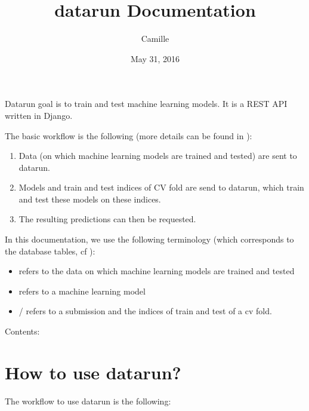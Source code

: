 \documentclass[letterpaper,10pt,english]{sphinxmanual}
\title{datarun Documentation}
\date{May 31, 2016}
\author{Camille}
\begin{document}
\maketitle
\tableofcontents
{}\label{index::doc}


Datarun goal is to train and test machine learning models. It is a REST API written in Django.

The basic workflow is the following (more details can be found in {\hyperref[modules/workflow:workflow]{}}):
\begin{enumerate}
\item {} 
Data (on which machine learning models are trained and tested) are sent to datarun.

\item {} 
Models and train and test indices of CV fold are send to datarun, which train and test these models on these indices.

\item {} 
The resulting predictions can then be requested.

\end{enumerate}

In this documentation, we use the following terminology (which corresponds to the database tables, cf {\hyperref[modules/models:models]{}}):
\begin{itemize}
\item {} 
 refers to the data on which machine learning models are trained and tested

\item {} 
 refers to a machine learning model

\item {} 
 /  refers to a submission and the indices of train and test of a cv fold.

\end{itemize}

Contents:


\chapter{How to use datarun?}
\label{modules/workflow:how-to-use-datarun}\label{modules/workflow::doc}\label{modules/workflow:welcome-to-datarun-s-documentation}\label{modules/workflow:workflow}
The workflow to use datarun is the following:
\end{document}
